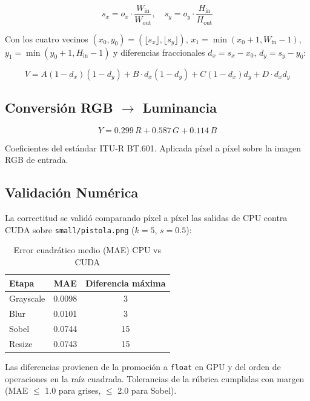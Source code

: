 \documentclass[12pt,a4paper]{article}
\begin{document}
\begin{equation}
s_x = o_x \cdot \frac{W_{\text{in}}}{W_{\text{out}}}, \quad s_y = o_y \cdot \frac{H_{\text{in}}}{H_{\text{out}}}
\end{equation}

Con los cuatro vecinos $(x_0,y_0) = (\lfloor s_x\rfloor, \lfloor s_y\rfloor)$, $x_1=\min(x_0+1, W_{\text{in}}-1)$, $y_1=\min(y_0+1, H_{\text{in}}-1)$ y diferencias fraccionales $d_x = s_x-x_0$, $d_y = s_y-y_0$:

\begin{equation}
V = A(1-d_x)(1-d_y) + B\cdot d_x(1-d_y) + C(1-d_x)d_y + D\cdot d_x d_y
\end{equation}

\subsection{Conversi\'on RGB $\rightarrow$ Luminancia}

\begin{equation}
Y = 0.299\,R + 0.587\,G + 0.114\,B
\end{equation}

Coeficientes del est\'andar ITU-R BT.601. Aplicada p\'ixel a p\'ixel sobre la imagen RGB de entrada.

\subsection{Validaci\'on Num\'erica}

La correctitud se valid\'o comparando p\'ixel a p\'ixel las salidas de CPU contra CUDA sobre \texttt{small/pistola.png} ($k=5$, $s=0.5$):

\begin{table}[H]
\centering
\caption{Error cuadr\'atico medio (MAE) CPU vs CUDA}
\begin{tabular}{lcc}
\toprule
\textbf{Etapa} & \textbf{MAE} & \textbf{Diferencia m\'axima} \\
\midrule
Grayscale & 0.0098 & 3 \\
Blur & 0.0101 & 3 \\
Sobel & 0.0744 & 15 \\
Resize & 0.0743 & 15 \\
\bottomrule
\end{tabular}
\end{table}

Las diferencias provienen de la promoci\'on a \texttt{float} en GPU y del orden de operaciones en la ra\'iz cuadrada. Tolerancias de la r\'ubrica cumplidas con margen (MAE $\leq$ 1.0 para grises, $\leq$ 2.0 para Sobel).
\end{document}
